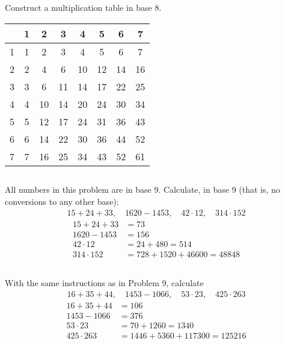 \documentclass{article} \usepackage{amsmath}
\begin{document}
\subsection{}
Construct a multiplication table in base 8.
\begin{center}
\begin{tabular}{ c|c c c c c c c }
    & 1 & 2 & 3 & 4 & 5 & 6 & 7 \\ 
    \hline
    1 & 1 & 2  & 3  & 4  & 5  & 6  & 7 \\ 
    2 & 2 & 4  & 6  & 10 & 12 & 14 & 16 \\ 
    3 & 3 & 6  & 11 & 14 & 17 & 22 & 25 \\ 
    4 & 4 & 10 & 14 & 20 & 24 & 30 & 34 \\ 
    5 & 5 & 12 & 17 & 24 & 31 & 36 & 43 \\ 
    6 & 6 & 14 & 22 & 30 & 36 & 44 & 52 \\
    7 & 7 & 16 & 25 & 34 & 43 & 52 & 61
\end{tabular}
\end{center}

\subsection{}
All numbers in this problem are in base 9.
Calculate, in base 9 (that is, no conversions to any other base):
\begin{gather*}
    15 + 24 + 33, \quad 1620 - 1453, \quad
    42 \cdot 12, \quad 314 \cdot 152
\end{gather*}
\begin{align*}
    15 + 24 + 33 &= 73\\
    1620 - 1453 &= 156\\
    42 \cdot 12 &= 24 + 480 = 514\\
    314 \cdot 152 &= 728 + 1520 + 46600 = 48848
\end{align*}

\subsection{}
With the same instructions as in Problem 9, calculate
\begin{gather*}
    16 + 35 + 44, \quad 1453 - 1066, \quad
    53 \cdot 23, \quad 425 \cdot 263
\end{gather*}
\begin{align*}
    16 + 35 + 44 &= 106\\
    1453 - 1066 &= 376\\
    53 \cdot 23 &= 70 + 1260 = 1340\\
    425 \cdot 263 &= 1446 + 5360 + 117300 = 125216
\end{align*}
\end{document}
